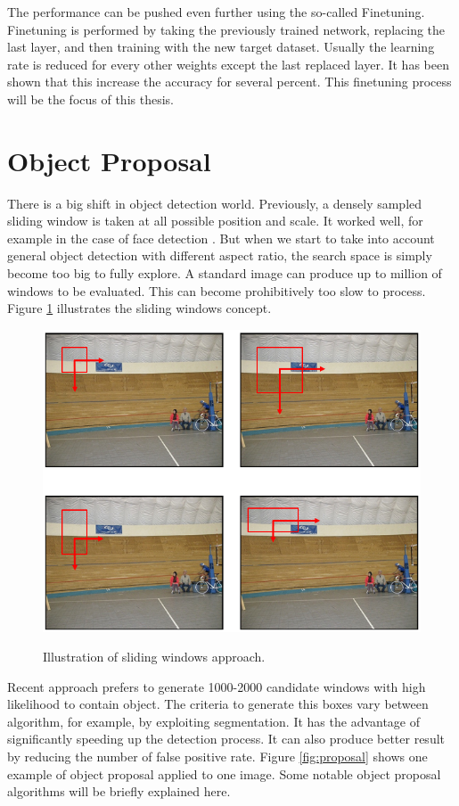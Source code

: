 \documentclass[a4paper,11pt]{kth-mag}
\begin{document}
The performance can be pushed even further using the so-called Finetuning. Finetuning is performed by taking the previously trained network, replacing the last layer, and then training with the new target dataset. Usually the learning rate is reduced for every other weights except the last replaced layer. It has been shown that this increase the accuracy for several percent. This finetuning process will be the focus of this thesis.

\section{Object Proposal}
There is a big shift in object detection world. Previously, a densely sampled sliding window is taken at all possible position and scale. It worked well, for example in the case of face detection \cite{violajones}. But when we start to take into account general object detection with different aspect ratio, the search space is simply become too big to fully explore. A standard image can produce up to million of windows to be evaluated. This can become prohibitively too slow to process. Figure \ref{fig:sliding_windows} illustrates the sliding windows concept.

\begin{figure}[h]
\centering
\includegraphics[scale=0.5]{image/sliding_windows.png}
\label{fig:sliding_windows}
\caption{Illustration of sliding windows approach.}
\end{figure}

Recent approach prefers to generate 1000-2000 candidate windows with high likelihood to contain object. The criteria to generate this boxes vary between algorithm, for example, by exploiting segmentation. It has the advantage of significantly speeding up the detection process. It can also produce better result by reducing the number of false positive rate. Figure \ref{fig:proposal} shows one example of object proposal applied to one image. Some notable object proposal algorithms will be briefly explained here.
\end{document}
